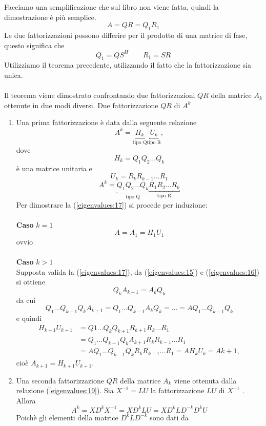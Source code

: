 \begin{thproof}
Facciamo una semplificazione che sul libro non viene fatta,
quindi la dimostrazione \`e pi\`u semplice.
$$ A = QR = Q_{1} R_1$$
Le due fattorizzazioni possono differire per il prodotto
di una matrice di fase, questo significa che
$$ Q_1 = QS^{H}  \qquad R_1 = SR $$
Utilizziamo il teorema precedente, utilizzando il fatto
che la fattorizzazione sia unica. \\ \\

 Il teorema viene dimostrato confrontando due fattorizzazioni $QR$
della matrice $A_k$ ottenute in due modi diversi.
Due fattorizzazione $QR$ di $A^{k}$
\begin{enumerate}
\item
 Una prima fattorizzazione \`e data dalla seguente relazione
\begin{equation}
  \label{eigenvalues:17}
 A^k = \underbracket{H_k}_{\text{tipo Q}} \underbracket{U_k}_{\text{tipo R}} ,
\end{equation}
dove
$$H_k = Q_1 Q_2 \ldots Q_k$$
\`e una matrice unitaria e
$$U_k = R_k R_{k−1} \ldots R_1$$
$$A^{k} = \underbracket{Q_1 Q_2 \ldots Q_k}_{\text{tipo Q}}
 \underbracket{R_1 R_2 \ldots R_k}_{\text{tipo R}}$$
Per dimostrare la (\ref{eigenvalues:17}) si procede per induzione: \\ \\
\textbf{Caso} $k=1$
 $$A = A_1 = H_1 U_1$$
 ovvio
\\
\\
\textbf{Caso} $k>1$ \\
Supposta valida la (\ref{eigenvalues:17}), da
  (\ref{eigenvalues:15}) e   (\ref{eigenvalues:16}) si ottiene
$$Q_k A_{k+1} = A_k Q_k $$
da cui
\begin{equation}
 \label{eigenvalues:18}
Q_1 \ldots Q_{k-1} Q_k A_{k+1} = Q_1 \ldots Q_{k-1} A_k Q_k = \ldots = AQ_1 \ldots Q_{k-1}
 Q_k
\end{equation}
e quindi
$$
\begin{array}{ll}
H_{k+1} U_{k+1} & = Q1 \ldots Q_k Q_{k+1} R_{k+1} R_k \ldots R_1 \\
 &  = Q_1 \ldots Q_{k-1} Q_k A_{k+1} R_k R_{k-1} \ldots R_1 \\
 & = AQ_1 \ldots Q_{k-1} Q_k R_k R_{k-1} \ldots R_1 = AH_k U_k = A{k+1} ,
\end{array}
$$
cio\`e
 $A_{k+1} = H_{k+1} U_{k+1} $.

\item
Una seconda fattorizzazione $QR$ della matrice $A_k$ viene ottenuta dalla
relazione  (\ref{eigenvalues:19}).
Sia $X^{-1} = LU $ la fattorizzazione $LU$ di $X^{-1}$
 . Allora
$$A^k = XD^k X^{-1} = XD^k LU = XD^k LD^{-k} D^{k} U$$
Poich\`e gli elementi della matrice $D^k LD^{-k}$ sono dati da


\end{enumerate}
\end{thproof}
